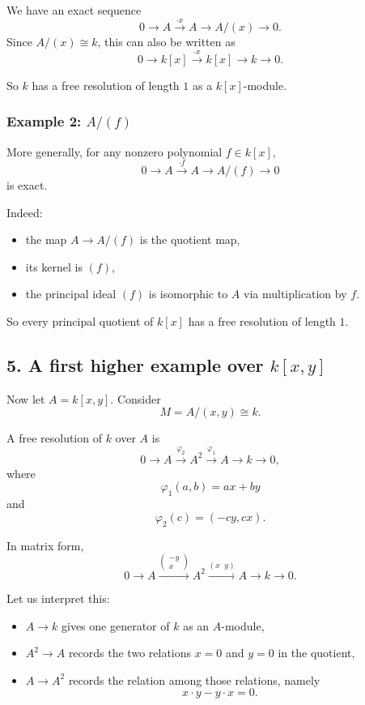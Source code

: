 \documentclass[12pt,a4paper]{article}
\theoremstyle{notespace}
\theoremstyle{definition}
\begin{document}
We have an exact sequence
\[
0 \longrightarrow A \xrightarrow{\cdot x} A \longrightarrow A/(x) \longrightarrow 0.
\]
Since \(A/(x)\cong k\), this can also be written as
\[
0 \longrightarrow k[x] \xrightarrow{\cdot x} k[x] \longrightarrow k \longrightarrow 0.
\]

So \(k\) has a free resolution of length \(1\) as a \(k[x]\)-module.

\subsubsection*{Example 2: \(A/(f)\)}

More generally, for any nonzero polynomial \(f \in k[x]\),
\[
0 \longrightarrow A \xrightarrow{\cdot f} A \longrightarrow A/(f) \longrightarrow 0
\]
is exact.

Indeed:
\begin{itemize}
	\item the map \(A \to A/(f)\) is the quotient map,
	\item its kernel is \((f)\),
	\item the principal ideal \((f)\) is isomorphic to \(A\) via multiplication by \(f\).
\end{itemize}

So every principal quotient of \(k[x]\) has a free resolution of length \(1\).

\subsection{5. A first higher example over \(k[x,y]\)}

Now let \(A=k[x,y]\). Consider
\[
M=A/(x,y)\cong k.
\]

A free resolution of \(k\) over \(A\) is
\[
0 \longrightarrow A \xrightarrow{\varphi_2} A^2 \xrightarrow{\varphi_1} A \longrightarrow k \longrightarrow 0,
\]
where
\[
\varphi_1(a,b)=ax+by
\]
and
\[
\varphi_2(c)=(-cy,cx).
\]

In matrix form,
\[
0 \longrightarrow A \xrightarrow{\begin{pmatrix}-y\\x\end{pmatrix}} A^2
\xrightarrow{(x\;\;y)} A \longrightarrow k \longrightarrow 0.
\]

Let us interpret this:
\begin{itemize}
	\item \(A \to k\) gives one generator of \(k\) as an \(A\)-module,
	\item \(A^2 \to A\) records the two relations \(x=0\) and \(y=0\) in the quotient,
	\item \(A \to A^2\) records the relation among those relations, namely
	\[
	x\cdot y - y\cdot x = 0.
	\]
\end{itemize}
\end{document}
